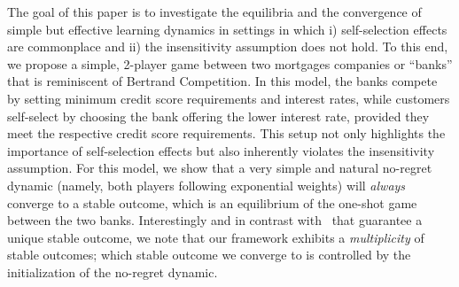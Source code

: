 The goal of this paper is to investigate the equilibria and the convergence of simple but effective learning dynamics in settings in which i) self-selection effects are commonplace and ii) the insensitivity assumption does not hold. To this end, we propose a simple, 2-player game between two mortgages companies or ``banks'' that is reminiscent of Bertrand Competition. In this model, the banks compete by setting minimum credit score requirements and interest rates, while customers self-select by choosing the bank offering the lower interest rate, provided they meet the respective credit score requirements. This setup not only highlights the importance of self-selection effects but also inherently violates the insensitivity assumption. For this model, we show that a very simple and natural no-regret dynamic (namely, both players following exponential weights) will \emph{always} converge to a stable outcome, which is an equilibrium of the one-shot game between the two banks. Interestingly and in contrast with~\cite{pmlr-v119-perdomo20a,narang2023multiplayer} that guarantee a unique stable outcome, we note that our framework exhibits a \emph{multiplicity} of stable outcomes; which stable outcome we converge to is controlled by the initialization of the no-regret dynamic. 

